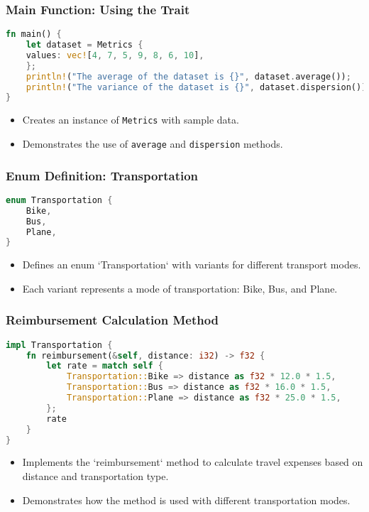 \documentclass[aspectratio=169, table]{beamer}
\begin{document}
\begin{frame}[fragile]
\frametitle{Main Function: Using the Trait}
\begin{lstlisting}[language=Rust]
fn main() {
	let dataset = Metrics {
	values: vec![4, 7, 5, 9, 8, 6, 10],
	};
	println!("The average of the dataset is {}", dataset.average()); 
	println!("The variance of the dataset is {}", dataset.dispersion()); 
}
\end{lstlisting}
\begin{itemize}
\item Creates an instance of \texttt{Metrics} with sample data.
\item Demonstrates the use of \texttt{average} and \texttt{dispersion} methods.
\end{itemize}
\end{frame}

\begin{frame}[fragile]
\frametitle{Enum Definition: Transportation}
\begin{lstlisting}[language=Rust]
enum Transportation {
	Bike, 
	Bus,
	Plane,
}
\end{lstlisting}
\begin{itemize}
\item Defines an enum `Transportation` with variants for different transport modes.
\item Each variant represents a mode of transportation: Bike, Bus, and Plane.
\end{itemize}
\end{frame}

\begin{frame}[fragile]
\frametitle{Reimbursement Calculation Method}
\vspace{20pt}
\begin{lstlisting}[language=Rust]
impl Transportation {
	fn reimbursement(&self, distance: i32) -> f32 {
		let rate = match self {
			Transportation::Bike => distance as f32 * 12.0 * 1.5,  
			Transportation::Bus => distance as f32 * 16.0 * 1.5,
			Transportation::Plane => distance as f32 * 25.0 * 1.5,
		}; 
		rate
	}
}
\end{lstlisting}
\begin{itemize}
\item Implements the `reimbursement` method to calculate travel expenses based on distance and transportation type.
\item Demonstrates how the method is used with different transportation modes.
\end{itemize}
\end{frame}
\end{document}
